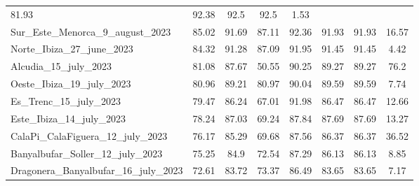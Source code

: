 \begin{table}[H]
{\begin{tabular}{lccccccc}
            81.93                                  & 92.38     &
            92.5                                   & 92.5      & 1.53
            \\
            Sur\_Este\_Menorca\_9\_august\_2023    & 85.02     & 91.69      &
            87.11                                  & 92.36     &
            91.93                                  & 91.93     & 16.57
            \\
            Norte\_Ibiza\_27\_june\_2023           & 84.32     & 91.28      &
            87.09                                  & 91.95     &
            91.45                                  & 91.45     & 4.42
            \\
            Alcudia\_15\_july\_2023                & 81.08     & 87.67      &
            50.55                                  & 90.25     &
            89.27                                  & 89.27     & 76.2
            \\
            Oeste\_Ibiza\_19\_july\_2023           & 80.96     & 89.21      &
            80.97                                  & 90.04     &
            89.59                                  & 89.59     & 7.74
            \\
            Es\_Trenc\_15\_july\_2023              & 79.47     & 86.24      &
            67.01                                  & 91.98     &
            86.47                                  & 86.47     & 12.66
            \\
            Este\_Ibiza\_14\_july\_2023            & 78.24     & 87.03      &
            69.24                                  & 87.84     &
            87.69                                  & 87.69     & 13.27
            \\
            CalaPi\_CalaFiguera\_12\_july\_2023    & 76.17     & 85.29      &
            69.68                                  & 87.56     &
            86.37                                  & 86.37     & 36.52
            \\
            Banyalbufar\_Soller\_12\_july\_2023    & 75.25     & 84.9       &
            72.54                                  & 87.29     &
            86.13                                  & 86.13     & 8.85
            \\
            Dragonera\_Banyalbufar\_16\_july\_2023 & 72.61     & 83.72      &
            73.37                                  & 86.49     &
            83.65                                  & 83.65     & 7.17
            \\

\end{tabular}}
\end{table}
